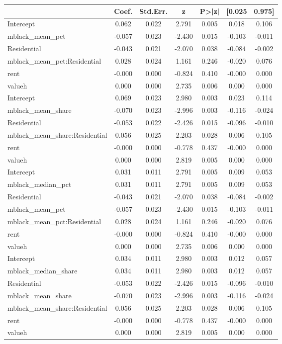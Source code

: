 \begin{tabular}{lcccccc}
\toprule
 & Coef. & Std.Err. & z & P>|z| & [0.025 & 0.975] \\
\midrule
Intercept & 0.062 & 0.022 & 2.791 & 0.005 & 0.018 & 0.106 \\
mblack_mean_pct & -0.057 & 0.023 & -2.430 & 0.015 & -0.103 & -0.011 \\
Residential & -0.043 & 0.021 & -2.070 & 0.038 & -0.084 & -0.002 \\
mblack_mean_pct:Residential & 0.028 & 0.024 & 1.161 & 0.246 & -0.020 & 0.076 \\
rent & -0.000 & 0.000 & -0.824 & 0.410 & -0.000 & 0.000 \\
valueh & 0.000 & 0.000 & 2.735 & 0.006 & 0.000 & 0.000 \\
Intercept & 0.069 & 0.023 & 2.980 & 0.003 & 0.023 & 0.114 \\
mblack_mean_share & -0.070 & 0.023 & -2.996 & 0.003 & -0.116 & -0.024 \\
Residential & -0.053 & 0.022 & -2.426 & 0.015 & -0.096 & -0.010 \\
mblack_mean_share:Residential & 0.056 & 0.025 & 2.203 & 0.028 & 0.006 & 0.105 \\
rent & -0.000 & 0.000 & -0.778 & 0.437 & -0.000 & 0.000 \\
valueh & 0.000 & 0.000 & 2.819 & 0.005 & 0.000 & 0.000 \\
Intercept & 0.031 & 0.011 & 2.791 & 0.005 & 0.009 & 0.053 \\
mblack_median_pct & 0.031 & 0.011 & 2.791 & 0.005 & 0.009 & 0.053 \\
Residential & -0.043 & 0.021 & -2.070 & 0.038 & -0.084 & -0.002 \\
mblack_mean_pct & -0.057 & 0.023 & -2.430 & 0.015 & -0.103 & -0.011 \\
mblack_mean_pct:Residential & 0.028 & 0.024 & 1.161 & 0.246 & -0.020 & 0.076 \\
rent & -0.000 & 0.000 & -0.824 & 0.410 & -0.000 & 0.000 \\
valueh & 0.000 & 0.000 & 2.735 & 0.006 & 0.000 & 0.000 \\
Intercept & 0.034 & 0.011 & 2.980 & 0.003 & 0.012 & 0.057 \\
mblack_median_share & 0.034 & 0.011 & 2.980 & 0.003 & 0.012 & 0.057 \\
Residential & -0.053 & 0.022 & -2.426 & 0.015 & -0.096 & -0.010 \\
mblack_mean_share & -0.070 & 0.023 & -2.996 & 0.003 & -0.116 & -0.024 \\
mblack_mean_share:Residential & 0.056 & 0.025 & 2.203 & 0.028 & 0.006 & 0.105 \\
rent & -0.000 & 0.000 & -0.778 & 0.437 & -0.000 & 0.000 \\
valueh & 0.000 & 0.000 & 2.819 & 0.005 & 0.000 & 0.000 \\
\bottomrule
\end{tabular}
